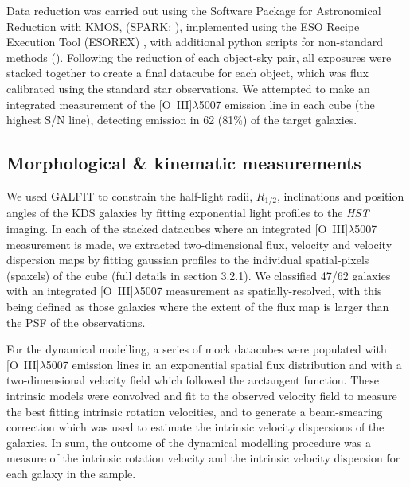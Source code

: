 \documentclass[fleqn,usenatbib]{mnras}
\begin{document}
\noindent
Data reduction was carried out using the Software Package for Astronomical Reduction with KMOS, (SPARK; \citealt{Davies2013}), implemented using the ESO Recipe Execution Tool (ESOREX) \citep{Freudling2013}, with additional python scripts for non-standard methods (\citealt{Turner2017}).
Following the reduction of each object-sky pair, all exposures were stacked together to create a final datacube for each object, which was flux calibrated using the standard star observations. 
We attempted to make an integrated measurement of the [O~{\sc III}]$\lambda$5007 emission line in each cube (the highest S/N line), detecting emission in 62 (81$\%$) of the target galaxies.

\subsection{Morphological \& kinematic measurements}\label{subsec:measurements}
We used {\scriptsize GALFIT} \citep{Peng2010_galfit} to constrain the half-light radii, $R_{1/2}$, inclinations and position angles of the KDS galaxies by fitting exponential light profiles to the {\it HST} imaging.
In each of the stacked datacubes where an integrated [O~{\sc III}]$\lambda$5007 measurement is made, we extracted two-dimensional flux, velocity and velocity dispersion maps by fitting gaussian profiles to the individual spatial-pixels (spaxels) of the cube (full details in \citealt{Turner2017} section 3.2.1).
We classified 47/62 galaxies with an integrated [O~{\sc III}]$\lambda$5007 measurement as spatially-resolved, with this being defined as those galaxies where the extent of the flux map is larger than the PSF of the observations.

For the dynamical modelling, a series of mock datacubes were populated with [O~{\sc III}]$\lambda$5007 emission lines in an exponential spatial flux distribution and with a two-dimensional velocity field which followed the arctangent function.
These intrinsic models were convolved and fit to the observed velocity field to measure the best fitting intrinsic rotation velocities, and to generate a beam-smearing correction which was used to estimate the intrinsic velocity dispersions of the galaxies.
In sum, the outcome of the dynamical modelling procedure was a measure of the intrinsic rotation velocity and the intrinsic velocity dispersion for each galaxy in the sample. \\
\end{document}
